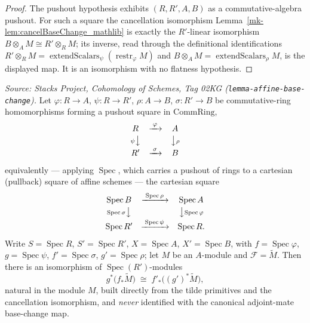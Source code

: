 \begin{proof}
  \leanok
  The pushout hypothesis exhibits \((R, R', A, B)\) as a commutative-algebra pushout.
  For such a square the cancellation isomorphism Lemma~\ref{mk-lem:cancelBaseChange_mathlib} is
  exactly the \(R'\)-linear isomorphism \(B \otimes_A M \cong R' \otimes_R M\); its
  inverse, read through the definitional identifications
  \(R' \otimes_R M = \operatorname{extendScalars}_\psi(\operatorname{restr}_\varphi M)\)
  and \(B \otimes_A M = \operatorname{extendScalars}_\rho M\), is the displayed map. It
  is an isomorphism with no flatness hypothesis.
\end{proof}

\begin{lemma}\label{mk-lem:affine_pushforward_pullback_baseChange}
  \leanok

  \textit{Source: Stacks Project, Cohomology of Schemes, Tag 02KG
  (\texttt{lemma-affine-base-change}).}
  Let \(\varphi : R \to A\), \(\psi : R \to R'\), \(\rho : A \to B\),
  \(\sigma : R' \to B\) be commutative-ring homomorphisms forming a pushout square in
  \(\mathrm{CommRing}\),
  \[
    \begin{array}{ccc}
      R & \xrightarrow{\;\varphi\;} & A \\[2pt]
      {\scriptstyle \psi}\big\downarrow & & \big\downarrow{\scriptstyle \rho} \\[2pt]
      R' & \xrightarrow{\;\sigma\;} & B
    \end{array}
  \]
  equivalently --- applying \(\operatorname{Spec}\), which carries a pushout of rings to
  a cartesian (pullback) square of affine schemes --- the cartesian square
  \[
    \begin{array}{ccc}
      \operatorname{Spec} B & \xrightarrow{\;\operatorname{Spec}\rho\;}
        & \operatorname{Spec} A \\[2pt]
      {\scriptstyle \operatorname{Spec}\sigma}\big\downarrow & &
        \big\downarrow{\scriptstyle \operatorname{Spec}\varphi} \\[2pt]
      \operatorname{Spec} R' & \xrightarrow{\;\operatorname{Spec}\psi\;}
        & \operatorname{Spec} R .
    \end{array}
  \]
  Write \(S = \operatorname{Spec} R\), \(S' = \operatorname{Spec} R'\),
  \(X = \operatorname{Spec} A\), \(X' = \operatorname{Spec} B\), with
  \(f = \operatorname{Spec}\varphi\), \(g = \operatorname{Spec}\psi\),
  \(f' = \operatorname{Spec}\sigma\), \(g' = \operatorname{Spec}\rho\); let \(M\) be an
  \(A\)-module and \(\mathcal{F} = \widetilde{M}\). Then there is an isomorphism of
  \(\operatorname{Spec}(R')\)-modules
  \[
    g^*\bigl(f_*\widetilde{M}\bigr)
    \;\cong\;
    f'_*\bigl((g')^*\widetilde{M}\bigr),
  \]
  natural in the module \(M\), built directly from the tilde primitives and the
  cancellation isomorphism, and \emph{never} identified with the canonical
  adjoint-mate base-change map.


\end{lemma}
